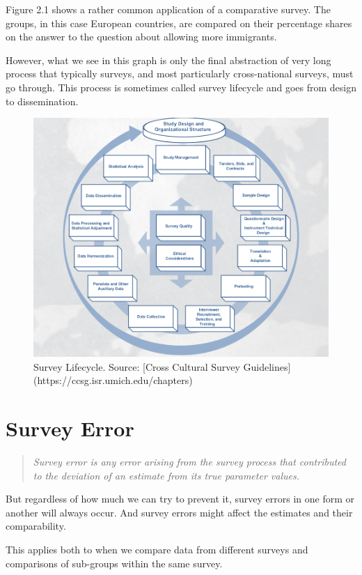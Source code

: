 \documentclass[
]{book}
\begin{document}
Figure 2.1 shows a rather common application of a comparative survey. The groups, in this case European countries, are compared on their percentage shares on the answer to the question about allowing more immigrants.

However, what we see in this graph is only the final abstraction of very long process that typically surveys, and most particularly cross-national surveys, must go through. This process is sometimes called survey lifecycle and goes from design to dissemination.

\begin{figure}
\includegraphics[width=0.8\linewidth]{lifecycle} \caption{Survey Lifecycle. Source: [Cross Cultural Survey Guidelines](https://ccsg.isr.umich.edu/chapters)}\label{fig:cycle}
\end{figure}

\hypertarget{survey-error}{%
\section{Survey Error}\label{survey-error}}

\begin{quote}
\emph{Survey error is any error arising from the survey process that contributed to the deviation of an estimate from its true parameter values.} \citep{Biemer}
\end{quote}

But regardless of how much we can try to prevent it, survey errors in one form or another will always occur. And survey errors might affect the estimates and their comparability.

This applies both to when we compare data from different surveys and comparisons of sub-groups within the same survey.
\end{document}
